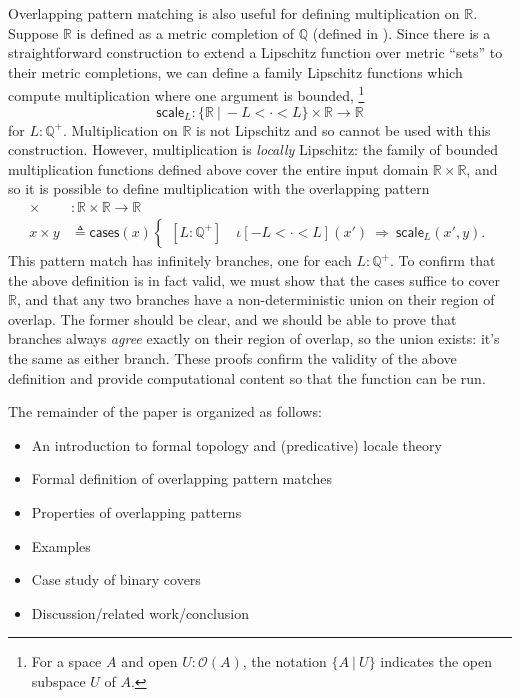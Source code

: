 \documentclass[conference]{IEEEtran}
\newcommand{\R}{\mathbb{R}}
\newcommand{\rat}{\mathbb{Q}}
\newcommand{\suchthat}{\ |\ }
\newcommand{\Open}[1]{\mathcal{O}({#1})}
\newcommand{\oinclf}[1]{\iota[{#1}]}
\newcommand{\oincl}[2]{\oinclf{#1} \left({#2}\right)}
\newcommand{\Branch}{\Rightarrow}
\begin{document}
Overlapping pattern matching is also useful for defining multiplication on $\R$. Suppose $\R$ is defined as a metric completion of $\rat$ (defined in \cite{vickersmetric}). Since there is a straightforward construction to extend a Lipschitz function over metric ``sets'' to their metric completions, we can define a family Lipschitz functions which compute multiplication where one argument is bounded, \footnote{For a space $A$ and open $U : \Open{A}$, the notation $\{ A \suchthat U \}$ indicates the open subspace $U$ of $A$.}
\[
\mathsf{scale}_L : \{ \R \suchthat -L < \cdot < L \} \times \R \to \R
\]
for $L : \rat^+$. Multiplication on $\R$ is not Lipschitz and so cannot be used with this construction. However, multiplication is \emph{locally} Lipschitz: the family of bounded multiplication functions defined above cover the entire input domain $\R \times \R$, and so it is possible to define multiplication with the overlapping pattern
\begin{align*}
\times &: \R \times \R \to \R
\\ x \times y &\triangleq
\mathsf{cases}(x)
\begin{cases}
[L : \rat^+] \quad \oincl{-L < \cdot < L}{x'}  \  \Branch \  \mathsf{scale}_L(x', y).
\end{cases}
\end{align*}
This pattern match has infinitely branches, one for each $L : \rat^+$. To confirm that the above definition is in fact valid, we must show that the cases suffice to cover $\R$, and that any two branches have a non-deterministic union on their region of overlap. The former should be clear, and we should be able to prove that branches always \emph{agree} exactly on their region of overlap, so the union exists: it's the same as either branch. These proofs confirm the validity of the above definition and provide computational content so that the function can be run.

The remainder of the paper is organized as follows:
\begin{itemize}
\item An introduction to formal topology and (predicative) locale theory
\item Formal definition of overlapping pattern matches
\item Properties of overlapping patterns
\item Examples
\item Case study of binary covers
\item Discussion/related work/conclusion
\end{itemize}
\end{document}
